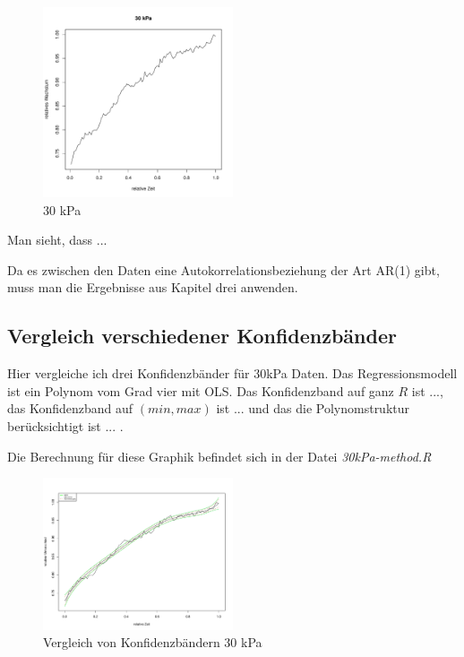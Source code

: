 \documentclass[12pt,a4paper]{article}
\theoremstyle{definition}
\theoremstyle{definition}
\theoremstyle{definition}
\begin{document}
\begin{figure}[H] 
  \centering
     \includegraphics[width=0.5\textwidth]{30kPa-data.pdf}
  \caption{30 kPa}
  \label{30kPa-data}
\end{figure}

Man sieht, dass ...

Da es zwischen den Daten eine Autokorrelationsbeziehung der Art AR(1) gibt, muss man die Ergebnisse aus Kapitel drei anwenden.


\subsection{Vergleich verschiedener Konfidenzbänder}
Hier vergleiche ich drei Konfidenzbänder für 30kPa Daten. Das Regressionsmodell ist ein Polynom vom Grad vier mit OLS. Das Konfidenzband auf ganz $R$ ist ..., das Konfidenzband auf $(min,max)$ ist ... und das die Polynomstruktur berücksichtigt ist ... . 

Die Berechnung für diese Graphik befindet sich in der Datei \textit{30kPa-method.R}

\begin{figure}[H] 
  \centering
     \includegraphics[width=0.5\textwidth]{30kPa-method.pdf}
  \caption{Vergleich von Konfidenzbändern 30 kPa}
  \label{fig:3}
\end{figure}
\end{document}
